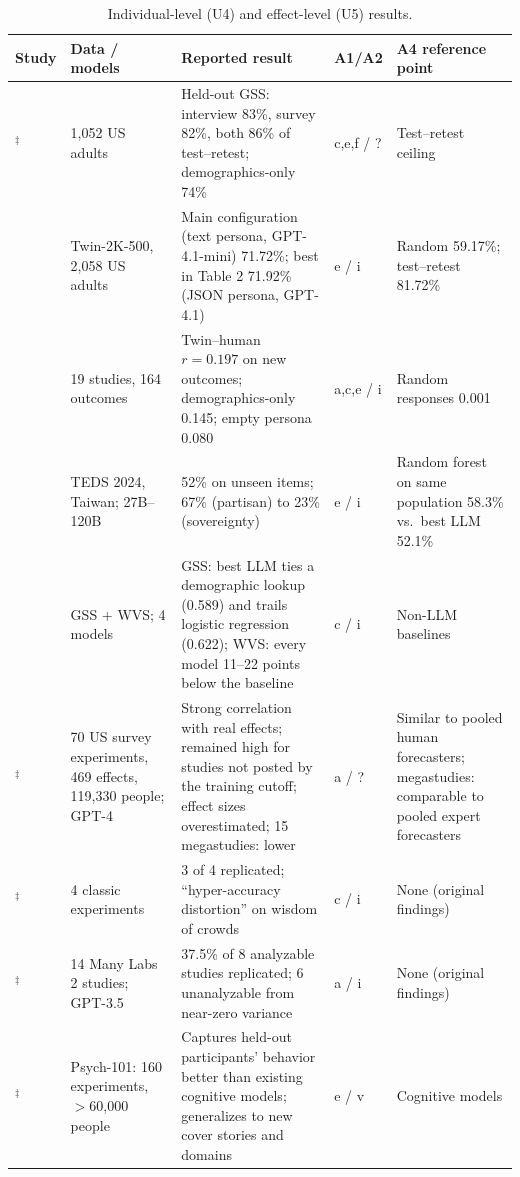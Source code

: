 \documentclass[11pt]{article}
\newcommand{\ab}{$^\ddagger$}
\begin{document}
\begin{table}[!htbp]
\centering
\scriptsize
\caption{Individual-level (U4) and effect-level (U5) results.}
\label{tab:indiv}
\begin{tabular}{@{}L{1.9cm}L{2.7cm}L{5.4cm}L{0.9cm}L{3.3cm}@{}}
\toprule
Study & Data / models & Reported result & A1/A2 & A4 reference point \\
\midrule
\citet{park2024}\ab & 1,052 US adults & Held-out GSS: interview 83\%, survey 82\%, both 86\% of test--retest; demographics-only 74\% & c,e,f / ? & Test--retest ceiling \\
\citet{toubia2025twin} & Twin-2K-500, 2,058 US adults & Main configuration (text persona, GPT-4.1-mini) 71.72\%; best in Table 2 71.92\% (JSON persona, GPT-4.1) & e / i & Random 59.17\%; test--retest 81.72\% \\
\citet{peng2025funhouse} & 19 studies, 164 outcomes & Twin--human $r=0.197$ on new outcomes; demographics-only 0.145; empty persona 0.080 & a,c,e / i & Random responses 0.001 \\
\citet{ku2026} & TEDS 2024, Taiwan; 27B--120B & 52\% on unseen items; 67\% (partisan) to 23\% (sovereignty) & e / i & Random forest on same population 58.3\% vs.\ best LLM 52.1\% \\
\citet{chen2026synthetic} & GSS + WVS; 4 models & GSS: best LLM ties a demographic lookup (0.589) and trails logistic regression (0.622); WVS: every model 11--22 points below the baseline & c / i & Non-LLM baselines \\
\citet{ashokkumar2026}\ab & 70 US survey experiments, 469 effects, 119,330 people; GPT-4 & Strong correlation with real effects; remained high for studies not posted by the training cutoff; effect sizes overestimated; 15 megastudies: lower & a / ? & Similar to pooled human forecasters; megastudies: comparable to pooled expert forecasters \\
\citet{aher2023}\ab & 4 classic experiments & 3 of 4 replicated; ``hyper-accuracy distortion'' on wisdom of crowds & c / i & None (original findings) \\
\citet{park2023diminished}\ab & 14 Many Labs 2 studies; GPT-3.5 & 37.5\% of 8 analyzable studies replicated; 6 unanalyzable from near-zero variance & a / i & None (original findings) \\
\citet{binz2025centaur}\ab & Psych-101: 160 experiments, $>$60,000 people & Captures held-out participants' behavior better than existing cognitive models; generalizes to new cover stories and domains & e / v & Cognitive models \\
\bottomrule
\end{tabular}
\end{table}
\end{document}
